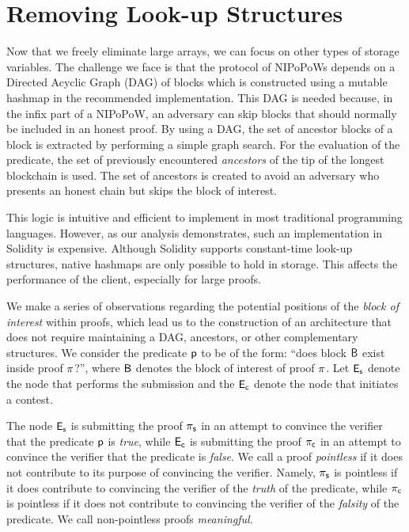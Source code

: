 \section{Removing Look-up Structures}

Now that we freely eliminate large arrays, we can focus on other
types of storage variables. The challenge we face is that the protocol of
NIPoPoWs depends on a Directed Acyclic Graph (DAG) of blocks which is constructed
using a mutable hashmap in the recommended implementation. This DAG is needed because, in the infix part of a NIPoPoW,
an adversary can skip blocks that
should normally be included in an honest proof. By using a DAG, the set of
ancestor blocks of a block is
extracted by performing a simple graph search. For the evaluation of the
predicate, the set of previously encountered \emph{ancestors} of the
tip of the longest blockchain is used.
The set of ancestors is created to avoid an adversary who presents an honest chain but
skips the block of interest.

This logic is intuitive and efficient to implement in most traditional
programming languages. However, as
our analysis demonstrates, such an implementation in Solidity is
expensive. Although Solidity supports constant-time look-up structures, native hashmaps
are only possible to hold in storage. This affects the performance of the client,
especially for large proofs.

We make a series of observations regarding the potential positions of the \emph{block of
interest} within proofs, which lead us to the construction of an architecture that
does not require maintaining a DAG, ancestors, or other complementary structures. We
consider the predicate $\mathsf{p}$ to be of the form: ``does block $\mathsf{B}$ exist
inside proof $\mathsf{\pi}$?'', where $\mathsf{B}$ denotes the block of interest of proof
$\mathsf{\pi}$. Let $\mathsf{E_{s}}$ denote the node that performs the submission and the $\mathsf{E_{c}}$
denote the node that initiates a contest.

The node $\mathsf{E_{s}}$ is submitting the proof $\mathsf{\pi_{s}}$ in an attempt to convince the verifier that
the predicate $\mathsf{p}$ is \emph{true}, while $\mathsf{E_{c}}$ is submitting the proof $\mathsf{\pi_{c}}$
in an attempt to convince the verifier that the predicate is \emph{false}.
We call a proof \emph{pointless} if it does not contribute to its purpose
of convincing the verifier. Namely, $\mathsf{\pi_{s}}$ is pointless if it does contribute to convincing
the verifier of the \emph{truth} of the predicate, while $\mathsf{\pi_{c}}$ is pointless if it
does not contribute to convincing the verifier of the \emph{falsity} of the predicate. We call
non-pointless proofs \emph{meaningful}.

